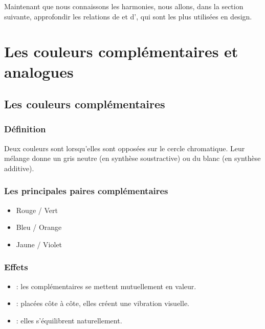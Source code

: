 Maintenant que nous connaissons les harmonies, nous allons, dans la section suivante, approfondir les relations de  et d', qui sont les plus utilisées en design.

\section{Les couleurs complémentaires et analogues}

\subsection{Les couleurs complémentaires}

\subsubsection{Définition}

Deux couleurs sont  lorsqu'elles sont opposées sur le cercle chromatique. Leur mélange donne un gris neutre (en synthèse soustractive) ou du blanc (en synthèse additive).

\subsubsection{Les principales paires complémentaires}

\begin{itemize}
    \item Rouge / Vert
    \item Bleu / Orange
    \item Jaune / Violet
\end{itemize}

\subsubsection{Effets}

\begin{itemize}
    \item {} : les complémentaires se mettent mutuellement en valeur.
    \item {} : placées côte à côte, elles créent une vibration visuelle.
    \item {} : elles s'équilibrent naturellement.
\end{itemize}

